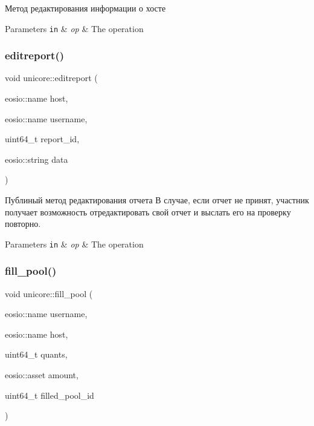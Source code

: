 Метод редактирования информации о хосте 


\begin{DoxyParams}[1]{Parameters}
\mbox{\tt in}  & {\em op} & The operation \\
\hline
\end{DoxyParams}
\mbox{\label{classunicore_ad041a75ade13b77f67f54c99f7ca7d29}} 
\subsubsection{\texorpdfstring{editreport()}{editreport()}}
{\footnotesize\ttfamily void unicore\+::editreport (\begin{DoxyParamCaption}\item[{eosio\+::name}]{host,  }\item[{eosio\+::name}]{username,  }\item[{uint64\+\_\+t}]{report\+\_\+id,  }\item[{eosio\+::string}]{data }\end{DoxyParamCaption})}



Публиный метод редактирования отчета В случае, если отчет не принят, участник получает возможность отредактировать свой отчет и выслать его на проверку повторно. 


\begin{DoxyParams}[1]{Parameters}
\mbox{\tt in}  & {\em op} & The operation \\
\hline
\end{DoxyParams}
\mbox{\label{classunicore_a415141b20af92120acd7a752d646b1fa}} 
\subsubsection{\texorpdfstring{fill\+\_\+pool()}{fill\_pool()}}
{\footnotesize\ttfamily void unicore\+::fill\+\_\+pool (\begin{DoxyParamCaption}\item[{eosio\+::name}]{username,  }\item[{eosio\+::name}]{host,  }\item[{uint64\+\_\+t}]{quants,  }\item[{eosio\+::asset}]{amount,  }\item[{uint64\+\_\+t}]{filled\+\_\+pool\+\_\+id }\end{DoxyParamCaption})\hspace{0.3cm}{\ttfamily [static]}}



